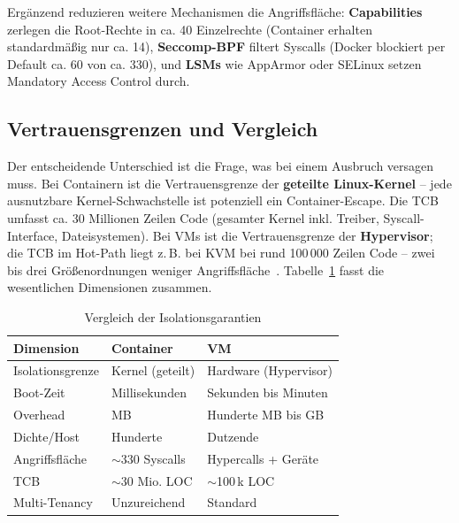 \documentclass[conference]{IEEEtran}
\begin{document}
Ergänzend reduzieren weitere Mechanismen die Angriffsfläche:
\textbf{Capabilities} zerlegen die Root-Rechte in ca. 40 Einzelrechte (Container
erhalten standardmäßig nur ca. 14), \textbf{Seccomp-BPF} filtert Syscalls (Docker
blockiert per Default ca. 60 von ca. 330), und \textbf{LSMs} wie AppArmor oder
SELinux setzen Mandatory Access Control durch.

\subsection{Vertrauensgrenzen und Vergleich}
Der entscheidende Unterschied ist die Frage, was bei einem Ausbruch versagen
muss. Bei Containern ist die Vertrauensgrenze der \textbf{geteilte Linux-Kernel}
-- jede ausnutzbare Kernel-Schwachstelle ist potenziell ein Container-Escape.
Die TCB umfasst ca. 30 Millionen Zeilen Code (gesamter Kernel inkl. Treiber,
Syscall-Interface, Dateisystemen). Bei VMs ist die Vertrauensgrenze der
\textbf{Hypervisor}; die TCB im Hot-Path liegt z.\,B. bei KVM bei rund
100\,000 Zeilen Code -- zwei bis drei Größenordnungen weniger
Angriffsfläche~\cite{b_nist_container,b_vm_container_compare}. Tabelle~\ref{tab:isolation} fasst die
wesentlichen Dimensionen zusammen.

\begin{table}[htbp]
\caption{Vergleich der Isolationsgarantien}
\label{tab:isolation}
\begin{center}
\footnotesize
\begin{tabular}{@{}p{2.0cm}p{2.4cm}p{2.6cm}@{}}
\toprule
\textbf{Dimension} & \textbf{Container} & \textbf{VM} \\
\midrule
Isolationsgrenze & Kernel (geteilt)        & Hardware (Hypervisor) \\
Boot-Zeit        & Millisekunden           & Sekunden bis Minuten \\
Overhead         & MB                      & Hunderte MB bis GB \\
Dichte/Host      & Hunderte                & Dutzende \\
Angriffsfläche   & $\sim$330 Syscalls      & Hypercalls + Geräte \\
TCB              & $\sim$30 Mio. LOC       & $\sim$100\,k LOC \\
Multi-Tenancy    & Unzureichend            & Standard \\
\bottomrule
\end{tabular}
\end{center}
\end{table}
\end{document}

